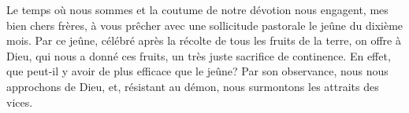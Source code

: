 Le temps où nous sommes et la coutume de notre dévotion
	nous engagent, mes bien chers frères,
	à vous prêcher avec une sollicitude pastorale le jeûne du dixième mois.
Par ce jeûne, célébré après la récolte de tous les fruits de la terre,
	on offre à Dieu, qui nous a donné ces fruits,
	un très juste sacrifice de continence.
En effet, que peut-il y avoir de plus efficace que le jeûne?
	Par son observance, nous nous approchons de Dieu,
	et, résistant au démon, nous surmontons les attraits des vices.
